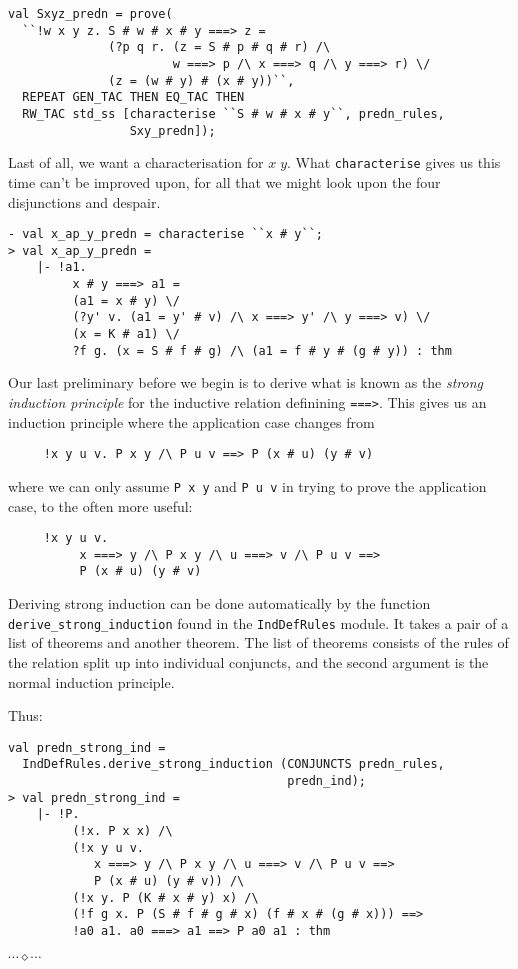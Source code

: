 \documentclass[12pt]{article}
\newcommand{\eos}{\hfill{}$\cdots\diamond\cdots$\hfill{}\vspace{5mm}}
\begin{document}
\begin{session}\begin{verbatim}
val Sxyz_predn = prove(
  ``!w x y z. S # w # x # y ===> z =
              (?p q r. (z = S # p # q # r) /\
                       w ===> p /\ x ===> q /\ y ===> r) \/
              (z = (w # y) # (x # y))``,
  REPEAT GEN_TAC THEN EQ_TAC THEN
  RW_TAC std_ss [characterise ``S # w # x # y``, predn_rules,
                 Sxy_predn]);
\end{verbatim}\end{session}
Last of all, we want a characterisation for $x\;y$.   What
\texttt{characterise} gives us this time can't be improved upon,
for all that we might look upon the four disjunctions and despair.
\begin{session}\begin{verbatim}
- val x_ap_y_predn = characterise ``x # y``;
> val x_ap_y_predn =
    |- !a1.
         x # y ===> a1 =
         (a1 = x # y) \/
         (?y' v. (a1 = y' # v) /\ x ===> y' /\ y ===> v) \/
         (x = K # a1) \/
         ?f g. (x = S # f # g) /\ (a1 = f # y # (g # y)) : thm
\end{verbatim}\end{session}
Our last preliminary before we begin is to derive what is known as the
\emph{strong induction principle} for the inductive relation
definining \texttt{===>}.  This gives us an induction principle where
the application case changes from
\begin{verbatim}
     !x y u v. P x y /\ P u v ==> P (x # u) (y # v)
\end{verbatim}
where we can only assume \texttt{P x y} and \texttt{P u v} in trying
to prove the application case, to the often more useful:
\begin{verbatim}
     !x y u v.
          x ===> y /\ P x y /\ u ===> v /\ P u v ==>
          P (x # u) (y # v)
\end{verbatim}
Deriving strong induction can be done automatically by the function\linebreak
\texttt{derive\_strong\_induction} found in the \texttt{IndDefRules}
module.  It takes a pair of a list of theorems and another theorem.
The list of theorems consists of the rules of the relation split up
into individual conjuncts, and the second argument is the normal
induction principle.

Thus:
\begin{session}\begin{verbatim}
val predn_strong_ind =
  IndDefRules.derive_strong_induction (CONJUNCTS predn_rules,
                                       predn_ind);
> val predn_strong_ind =
    |- !P.
         (!x. P x x) /\
         (!x y u v.
            x ===> y /\ P x y /\ u ===> v /\ P u v ==>
            P (x # u) (y # v)) /\
         (!x y. P (K # x # y) x) /\
         (!f g x. P (S # f # g # x) (f # x # (g # x))) ==>
         !a0 a1. a0 ===> a1 ==> P a0 a1 : thm
\end{verbatim}\end{session}
\eos{}
\end{document}

